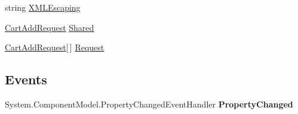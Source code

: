 \begin{DoxyCompactItemize}
\begin{DoxyCompactList}\small\item\em \end{DoxyCompactList}\item 
\hypertarget{class_amazon___price___finder_1_1amazon_1_1ecs_1_1_cart_add_a424706ac59d54221baea7e01cdae182d}{string \hyperlink{class_amazon___price___finder_1_1amazon_1_1ecs_1_1_cart_add_a424706ac59d54221baea7e01cdae182d}{X\-M\-L\-Escaping}}\label{class_amazon___price___finder_1_1amazon_1_1ecs_1_1_cart_add_a424706ac59d54221baea7e01cdae182d}

\begin{DoxyCompactList}\small\item\em \end{DoxyCompactList}\item 
\hypertarget{class_amazon___price___finder_1_1amazon_1_1ecs_1_1_cart_add_a527dcf34c3f2cb8922d2322e017af5c4}{\hyperlink{class_amazon___price___finder_1_1amazon_1_1ecs_1_1_cart_add_request}{Cart\-Add\-Request} \hyperlink{class_amazon___price___finder_1_1amazon_1_1ecs_1_1_cart_add_a527dcf34c3f2cb8922d2322e017af5c4}{Shared}}\label{class_amazon___price___finder_1_1amazon_1_1ecs_1_1_cart_add_a527dcf34c3f2cb8922d2322e017af5c4}

\begin{DoxyCompactList}\small\item\em \end{DoxyCompactList}\item 
\hypertarget{class_amazon___price___finder_1_1amazon_1_1ecs_1_1_cart_add_a0ccb76e6ba35b185d53cd3fd503be5e4}{\hyperlink{class_amazon___price___finder_1_1amazon_1_1ecs_1_1_cart_add_request}{Cart\-Add\-Request}\mbox{[}$\,$\mbox{]} \hyperlink{class_amazon___price___finder_1_1amazon_1_1ecs_1_1_cart_add_a0ccb76e6ba35b185d53cd3fd503be5e4}{Request}}\label{class_amazon___price___finder_1_1amazon_1_1ecs_1_1_cart_add_a0ccb76e6ba35b185d53cd3fd503be5e4}

\begin{DoxyCompactList}\small\item\em \end{DoxyCompactList}\end{DoxyCompactItemize}
\subsection*{Events}
\begin{DoxyCompactItemize}
\item 
\hypertarget{class_amazon___price___finder_1_1amazon_1_1ecs_1_1_cart_add_a5b754232c15dea0f0dccc31c82b62790}{System.\-Component\-Model.\-Property\-Changed\-Event\-Handler {\bfseries Property\-Changed}}\label{class_amazon___price___finder_1_1amazon_1_1ecs_1_1_cart_add_a5b754232c15dea0f0dccc31c82b62790}

\end{DoxyCompactItemize}


